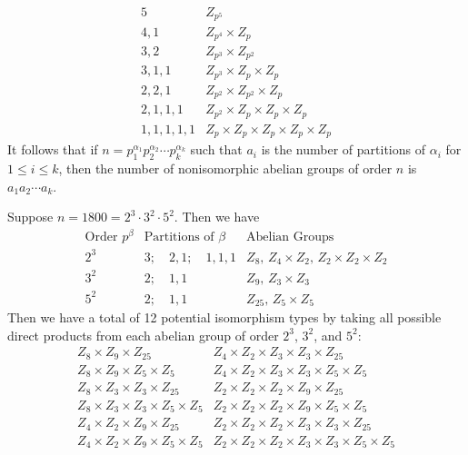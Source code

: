 \begin{ex}
\begin{itemize}
\[\begin{array}{c|c}
            \hline
            5 & Z_{p^5} \\
            4, 1 & Z_{p^4} \times Z_p \\
            3, 2 & Z_{p^3} \times Z_{p^2} \\
            3, 1, 1 & Z_{p^3} \times Z_p \times Z_p \\
            2, 2, 1 & Z_{p^2} \times Z_{p^2} \times Z_p \\
            2, 1, 1, 1 & Z_{p^2} \times Z_p \times Z_p \times Z_p \\
            1, 1, 1, 1, 1 & Z_p \times Z_p \times Z_p \times Z_p \times Z_p
        \end{array}\]
        It follows that if $n = p_1^{\alpha_1} p_2^{\alpha_2} \cdots p_k^{\alpha_k}$ such that $a_i$ is the number of partitions of $\alpha_i$ for $1 \leq i \leq k$, then the number of nonisomorphic abelian groups of order $n$ is $a_1 a_2 \cdots a_k$.
    \end{itemize}
\end{ex}

\begin{ex}
    Suppose $n = 1800 = 2^3 \cdot 3^2 \cdot 5^2$. Then we have
    \[
    \begin{array}{c|c|c}
        \text{Order $p^\beta$} & \text{Partitions of $\beta$} & \text{Abelian Groups} \\
        \hline
        2^3 & 3; \quad 2, 1; \quad 1, 1, 1 & Z_{8}, \, Z_4 \times Z_2, \, Z_2 \times Z_2 \times Z_2 \\
        3^2 & 2; \quad 1, 1 & Z_9, \, Z_3 \times Z_3 \\
        5^2 & 2; \quad 1, 1 & Z_{25}, \, Z_5 \times Z_5
    \end{array}\]
    Then we have a total of 12 potential isomorphism types by taking all possible direct products from each abelian group of order $2^3$, $3^2$, and $5^2$:
    \[
    \begin{array}{ll}
        Z_8 \times Z_9 \times Z_{25} & Z_4 \times Z_2 \times Z_3 \times Z_3 \times Z_{25} \\
        Z_8 \times Z_9 \times Z_5 \times Z_5 & Z_4 \times Z_2 \times Z_3 \times Z_3 \times Z_5 \times Z_5 \\
        Z_8 \times Z_3 \times Z_3 \times Z_{25} & Z_2 \times Z_2 \times Z_2 \times Z_9 \times Z_{25} \\
        Z_8 \times Z_3 \times Z_3 \times Z_5 \times Z_5 & Z_2 \times Z_2 \times Z_2 \times Z_9 \times Z_5 \times Z_5 \\
        Z_4 \times Z_2 \times Z_9 \times Z_{25} & Z_2 \times Z_2 \times Z_2 \times Z_3 \times Z_3 \times Z_{25} \\
        Z_4 \times Z_2 \times Z_9 \times Z_5 \times Z_5 & Z_2 \times Z_2 \times Z_2 \times Z_3 \times Z_3 \times Z_5 \times Z_5
    \end{array}\]
\end{ex}

